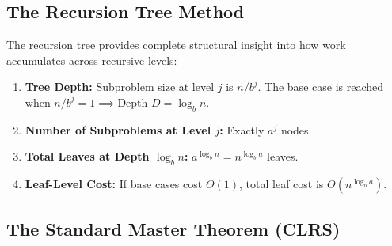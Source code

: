 \documentclass[11pt,a4paper]{article}
\begin{document}
\subsection{The Recursion Tree Method}
The recursion tree provides complete structural insight into how work accumulates across recursive levels:

\begin{center}
\end{center}

\begin{enumerate}[leftmargin=2em, itemsep=2pt]
    \item \textbf{Tree Depth:} Subproblem size at level $j$ is $n/b^j$. The base case is reached when $n/b^j = 1 \implies \text{Depth } D = \log_b n$.
    \item \textbf{Number of Subproblems at Level $j$:} Exactly $a^j$ nodes.
    \item \textbf{Total Leaves at Depth $\log_b n$:} $a^{\log_b n} = n^{\log_b a}$ leaves.
    \item \textbf{Leaf-Level Cost:} If base cases cost $\Theta(1)$, total leaf cost is $\Theta(n^{\log_b a})$.
\end{enumerate}

\subsection{The Standard Master Theorem (CLRS)}
\end{document}
